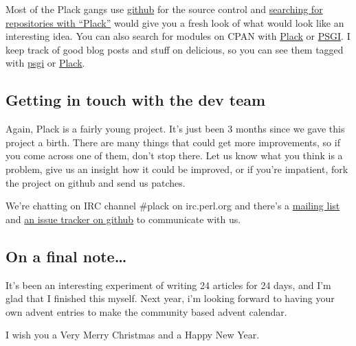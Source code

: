 Most of the Plack gangs use \href{http://github.com/}{github} for the
source control and
\href{http://github.com/search?langOverride=\&q=plack\&repo=\&start_value=1\&type=Repositories}{searching
for repositories with ``Plack''} would give you a fresh look of what
would look like an interesting idea. You can also search for modules on
CPAN with
\href{http://search.cpan.org/search?query=plack\&mode=module}{Plack} or
\href{http://search.cpan.org/search?query=psgi\&mode=module}{PSGI}. I
keep track of good blog posts and stuff on delicious, so you can see
them tagged with \href{http://delicious.com/miyagawa/psgi}{psgi} or
\href{http://delicious.com/miyagawa/plack}{Plack}.

\subsection{Getting in touch with the dev
team}\label{getting-in-touch-with-the-dev-team}

Again, Plack is a fairly young project. It's just been 3 months since we
gave this project a birth. There are many things that could get more
improvements, so if you come across one of them, don't stop there. Let
us know what you think is a problem, give us an insight how it could be
improved, or if you're impatient, fork the project on github and send us
patches.

We're chatting on IRC channel \#plack on irc.perl.org and there's a
\href{http://groups.google.com/group/psgi-plack}{mailing list} and
\href{http://github.com/plack/Plack/issues}{an issue tracker on github}
to communicate with us.

\subsection{On a final note\ldots{}}\label{on-a-final-note}

It's been an interesting experiment of writing 24 articles for 24 days,
and I'm glad that I finished this myself. Next year, i'm looking forward
to having your own advent entries to make the community based advent
calendar.

I wish you a Very Merry Christmas and a Happy New Year.
